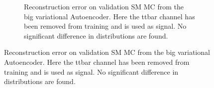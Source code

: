 \begin{figure}[h!]
\begin{subfigure}{.45\textwidth}
        \caption{Reconstruction error on validation SM MC from the big variational Autoencoder. Here the ttbar channel has been removed from training and 
        is used as signal. No significant difference in distributions are found. }
        \label{fig:vae_big_ttbar}
    \end{subfigure}
    \hfill 
    \label{fig:vae_big_channel_3}
\end{figure}